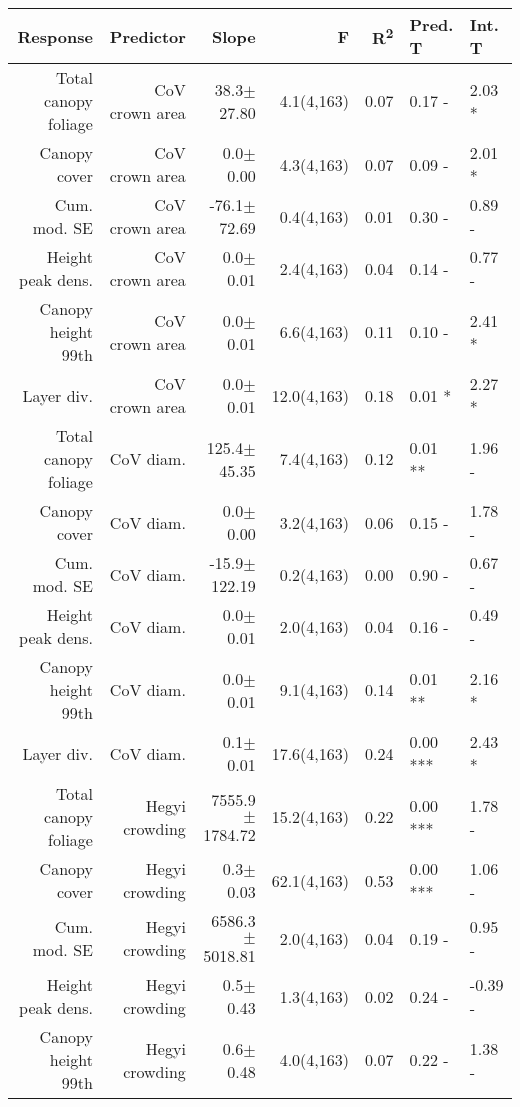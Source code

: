 \begin{table}[H]
\centering
\begin{tabular}{rrrrrll}
  \hline
Response & Predictor & Slope & F & R\textsuperscript{2} & Pred. T & Int. T \\ 
  \hline
Total canopy foliage & CoV crown area & 38.3$\pm$27.80 & 4.1(4,163) & 0.07 & 0.17 - & 2.03 * \\ 
  Canopy cover & CoV crown area & 0.0$\pm$0.00 & 4.3(4,163) & 0.07 & 0.09 - & 2.01 * \\ 
  Cum. mod. SE & CoV crown area & -76.1$\pm$72.69 & 0.4(4,163) & 0.01 & 0.30 - & 0.89 - \\ 
  Height peak dens. & CoV crown area & 0.0$\pm$0.01 & 2.4(4,163) & 0.04 & 0.14 - & 0.77 - \\ 
  Canopy height 99th & CoV crown area & 0.0$\pm$0.01 & 6.6(4,163) & 0.11 & 0.10 - & 2.41 * \\ 
  Layer div. & CoV crown area & 0.0$\pm$0.01 & 12.0(4,163) & 0.18 & 0.01 * & 2.27 * \\ 
  Total canopy foliage & CoV diam. & 125.4$\pm$45.35 & 7.4(4,163) & 0.12 & 0.01 ** & 1.96 - \\ 
  Canopy cover & CoV diam. & 0.0$\pm$0.00 & 3.2(4,163) & 0.06 & 0.15 - & 1.78 - \\ 
  Cum. mod. SE & CoV diam. & -15.9$\pm$122.19 & 0.2(4,163) & 0.00 & 0.90 - & 0.67 - \\ 
  Height peak dens. & CoV diam. & 0.0$\pm$0.01 & 2.0(4,163) & 0.04 & 0.16 - & 0.49 - \\ 
  Canopy height 99th & CoV diam. & 0.0$\pm$0.01 & 9.1(4,163) & 0.14 & 0.01 ** & 2.16 * \\ 
  Layer div. & CoV diam. & 0.1$\pm$0.01 & 17.6(4,163) & 0.24 & 0.00 *** & 2.43 * \\ 
  Total canopy foliage & Hegyi crowding & 7555.9$\pm$1784.72 & 15.2(4,163) & 0.22 & 0.00 *** & 1.78 - \\ 
  Canopy cover & Hegyi crowding & 0.3$\pm$0.03 & 62.1(4,163) & 0.53 & 0.00 *** & 1.06 - \\ 
  Cum. mod. SE & Hegyi crowding & 6586.3$\pm$5018.81 & 2.0(4,163) & 0.04 & 0.19 - & 0.95 - \\ 
  Height peak dens. & Hegyi crowding & 0.5$\pm$0.43 & 1.3(4,163) & 0.02 & 0.24 - & -0.39 - \\ 
  Canopy height 99th & Hegyi crowding & 0.6$\pm$0.48 & 4.0(4,163) & 0.07 & 0.22 - & 1.38 - \\ 

\end{tabular}
\end{table}
